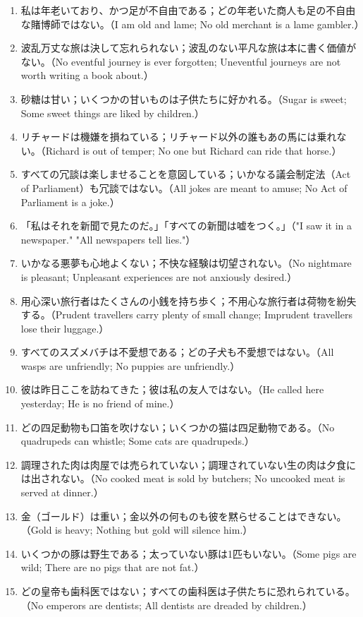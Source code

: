 \documentclass[a4paper,11pt,openany]{ltjsbook}
\begin{document}
\begin{enumerate}[label=\textbf{\arabic*.}]
\item 私は年老いており、かつ足が不自由である；どの年老いた商人も足の不自由な賭博師ではない。（I am old and lame; No old merchant is a lame gambler.）
\item 波乱万丈な旅は決して忘れられない；波乱のない平凡な旅は本に書く価値がない。（No eventful journey is ever forgotten; Uneventful journeys are not worth writing a book about.）
\item 砂糖は甘い；いくつかの甘いものは子供たちに好かれる。（Sugar is sweet; Some sweet things are liked by children.）
\item リチャードは機嫌を損ねている；リチャード以外の誰もあの馬には乗れない。（Richard is out of temper; No one but Richard can ride that horse.）
\item すべての冗談は楽しませることを意図している；いかなる議会制定法（Act of Parliament）も冗談ではない。（All jokes are meant to amuse; No Act of Parliament is a joke.）
\item 「私はそれを新聞で見たのだ。」「すべての新聞は嘘をつく。」（"I saw it in a newspaper." "All newspapers tell lies."）
\item いかなる悪夢も心地よくない；不快な経験は切望されない。（No nightmare is pleasant; Unpleasant experiences are not anxiously desired.）
\item 用心深い旅行者はたくさんの小銭を持ち歩く；不用心な旅行者は荷物を紛失する。（Prudent travellers carry plenty of small change; Imprudent travellers lose their luggage.）
\item すべてのスズメバチは不愛想である；どの子犬も不愛想ではない。（All wasps are unfriendly; No puppies are unfriendly.）
\item 彼は昨日ここを訪ねてきた；彼は私の友人ではない。（He called here yesterday; He is no friend of mine.）
\item どの四足動物も口笛を吹けない；いくつかの猫は四足動物である。（No quadrupeds can whistle; Some cats are quadrupeds.）
\item 調理された肉は肉屋では売られていない；調理されていない生の肉は夕食には出されない。（No cooked meat is sold by butchers; No uncooked meat is served at dinner.）
\item 金（ゴールド）は重い；金以外の何ものも彼を黙らせることはできない。（Gold is heavy; Nothing but gold will silence him.）
\item いくつかの豚は野生である；太っていない豚は1匹もいない。（Some pigs are wild; There are no pigs that are not fat.）
\item どの皇帝も歯科医ではない；すべての歯科医は子供たちに恐れられている。（No emperors are dentists; All dentists are dreaded by children.）

\end{enumerate}
\end{document}
